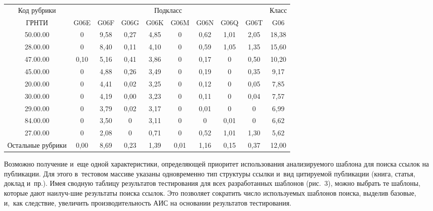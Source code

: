 \begin{multicols}{2}
\begin{table*}[b]\small %
\vspace*{-6pt}
\begin{center}
\vspace*{2ex}

\begin{tabular}{|c|c|c|c|c|c|c|c|c|c|}
\hline
Код рубрики&
\multicolumn{8}{c|}{Подкласс}&Класс \\
\cline{2-9}
ГРНТИ& G06E&
G06F&
 G06G&
 G06K&
 G06M&
 G06N&
 G06Q&
 G06T&G06\\
\hline
50.00.00&
0&9,58&0,27&4,85&0&0,62&1,01&2,05&18,38\\
28.00.00&0&8,40&0,11&4,10&0&0,59&1,05&1,35&15,60\\
47.00.00&
0,10&5,16&0,41&3,86&0&0,17&0&0,50&10,20\\
45.00.00&0&4,88&0,26&3,49&0&0,19&0&0,35&\hphantom{9}9,17\\
20.00.00&0&4,41&0,02&3,25&0&0,12&0&0,05&\hphantom{9}7,85\\
30.00.00&0&4,19&0,00&3,23&0&0,11&0&0,04&\hphantom{9}7,57\\
29.00.00&0&3,79&0,02&3,17&0&0,01&0&0&\hphantom{9}6,99\\
84.00.00&0&3,50&0&3,11&0&0&0,01&0&\hphantom{9}6,62\\
27.00.00&0&2,08&0&0,71&0&0,52&1,01&1,30&\hphantom{9}5,62\\
Остальные рубрики &0,00&8,69&0,23&1,39&0,01&1,16&0,15&0,37&12,00\\
\hline
\end{tabular}
\end{center}
\end{table*}


  Возможно получение и~еще одной характеристики, определяющей приоритет
использования анализируемого шаблона для поиска ссылок на пуб\-ли\-ка\-ции.
Для этого в~тестовом массиве указаны одновременно тип структуры ссылки и~вид
ци\-ти\-ру\-емой
пуб\-ли\-ка\-ции (книга, статья, доклад  и~пр.). Имея сводную таб\-ли\-цу результатов тестирования
для всех разработанных шаблонов (рис.~3),  можно
 выбрать те шаблоны, которые дают
наилуч-\linebreak шие результаты поиска ссылок. Это позволяет сократить число используемых
шаблонов поиска, выделив базовые, и,~как следствие, увеличить про\-из\-во\-ди\-тель\-ность АИС на
основании результатов тести\-ро\-вания.
{ %

}
\end{multicols}
